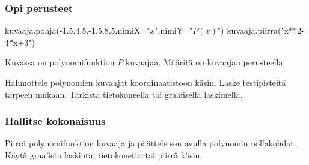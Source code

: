 \begin{tehtavasivu}

\subsubsection*{Opi perusteet}

\begin{tehtava}

\begin{kuva}
	kuvaaja.pohja(-1.5,4.5,-1.5,8,5,nimiX="$x$",nimiY="$P(x)$")
	kuvaaja.piirra("x**2-4*x+3")
\end{kuva}
Kuvassa on polynomifunktion $P$ kuvaajaa. Määritä on kuvaajan perusteella
\begin{vastaus}
	\end{vastaus}
\end{tehtava}

\begin{tehtava}
    Hahmottele polynomien kuvaajat koordinaatistoon käsin. Laske testipisteitä tarpeen mukaan. Tarkista tietokoneella tai graafisella laskimella.
    \begin{vastaus}
    \end{vastaus}
\end{tehtava}

\subsubsection*{Hallitse kokonaisuus}

\begin{tehtava}
Piirrä polynomifunktion kuvaaja ja päättele sen avulla polynomin nollakohdat. Käytä graafista laskinta, tietokonetta tai piirrä käsin.
	\begin{vastaus}
	\end{vastaus}
\end{tehtava}


\end{tehtavasivu}
